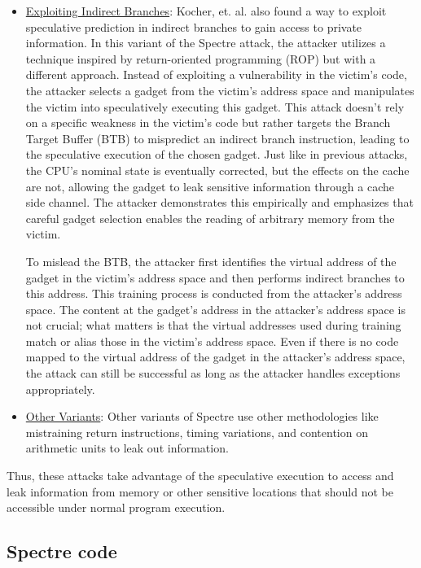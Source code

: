 \documentclass[twocolumn,showpacs,%
  nofootinbib,aps,superscriptaddress,%
  eqsecnum,prd,notitlepage,showkeys,10pt]{revtex4-1}
\begin{document}
\begin{itemize}
\item \underline{Exploiting Indirect Branches}: Kocher, et. al. also found a way to exploit speculative prediction in indirect branches to gain access to private information\cite{kocher2020spectre}. In this variant of the Spectre attack, the attacker utilizes a technique inspired by return-oriented programming (ROP) but with a different approach. Instead of exploiting a vulnerability in the victim's code, the attacker selects a gadget from the victim's address space and manipulates the victim into speculatively executing this gadget. This attack doesn't rely on a specific weakness in the victim's code but rather targets the Branch Target Buffer (BTB) to mispredict an indirect branch instruction, leading to the speculative execution of the chosen gadget. Just like in previous attacks, the CPU's nominal state is eventually corrected, but the effects on the cache are not, allowing the gadget to leak sensitive information through a cache side channel. The attacker demonstrates this empirically and emphasizes that careful gadget selection enables the reading of arbitrary memory from the victim.

To mislead the BTB, the attacker first identifies the virtual address of the gadget in the victim's address space and then performs indirect branches to this address. This training process is conducted from the attacker's address space. The content at the gadget's address in the attacker's address space is not crucial; what matters is that the virtual addresses used during training match or alias those in the victim's address space. Even if there is no code mapped to the virtual address of the gadget in the attacker's address space, the attack can still be successful as long as the attacker handles exceptions appropriately.

\item \underline{Other Variants}: Other variants of Spectre use other methodologies like mistraining return instructions, timing variations, and contention on arithmetic units to leak out information.\cite{kocher2020spectre}
\end{itemize}

Thus, these attacks take advantage of the speculative execution to access and leak information from memory or other sensitive locations that should not be accessible under normal program execution.

\subsection{Spectre code}
\end{document}
